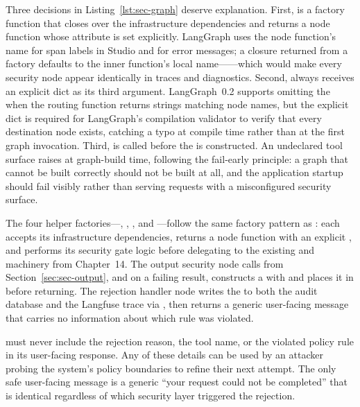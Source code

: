 Three decisions in Listing~\ref{lst:sec-graph} deserve explanation.
First,  is a factory function that closes
over the infrastructure dependencies and returns a node function whose
 attribute is set explicitly. LangGraph uses the
node function's name for span labels in Studio and for error messages;
a closure returned from a factory defaults to the inner function's
local name------which would make every security node
appear identically in traces and diagnostics. Second,
 always receives an explicit
 dict as its third argument. LangGraph~0.2 supports
omitting the  when the routing function returns strings
matching node names, but the explicit dict is required for LangGraph's
compilation validator to verify that every destination node exists,
catching a typo at compile time rather than at the first graph
invocation. Third,  is called
before the  is constructed. An undeclared tool surface
raises  at graph-build time, following the fail-early
principle: a graph that cannot be built correctly should not be built
at all, and the application startup should fail visibly rather than
serving requests with a misconfigured security surface.

The four helper factories---,
, , and
---follow the same factory pattern as
: each accepts its infrastructure
dependencies, returns a node function with an explicit
, and performs its security gate logic before
delegating to the existing  and 
machinery from Chapter~14. The output security node calls
 from Section~\ref{sec:sec-output}, and
on a failing result, constructs a  with
 and places it in
 before returning. The rejection handler
node writes the  to both the audit database and
the Langfuse trace via , then returns a
generic user-facing message that carries no information about which
rule was violated.

\begin{warningbox}
 must never include the rejection
reason, the tool name, or the violated policy rule in its user-facing
response. Any of these details can be used by an attacker probing the
system's policy boundaries to refine their next attempt. The only safe
user-facing message is a generic ``your request could not be completed''
that is identical regardless of which security layer triggered the
rejection.
\end{warningbox}

